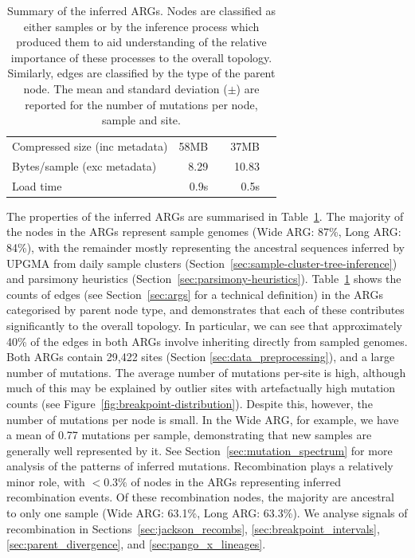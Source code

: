 \documentclass{article}
\begin{document}
\begin{table}
\begin{center}
\begin{tabular}{llrlrl}
    \cmidrule{2-6}
    \multicolumn{2}{l}{Compressed size (inc metadata)} & 58MB & & 37MB&  \\
    \multicolumn{2}{l}{Bytes/sample (exc metadata)}  & 8.29  & & 10.83 \\
    Load time & & 0.9s & & 0.5s & \\
    \bottomrule
\end{tabular}
\end{center}
\caption{\label{tab:args}Summary of the inferred ARGs. Nodes are classified
as either samples or by the inference process which produced them to aid
understanding of the relative importance of these processes to the overall
topology. Similarly, edges are classified by the type of the parent node.
The mean and standard deviation ($\pm$)
are reported for the number of mutations per node, sample and site.
}
\end{table}

The properties of the inferred ARGs are summarised in Table~\ref{tab:args}.
The majority of the nodes in the ARGs represent sample genomes
(Wide ARG: 87\%, Long ARG: 84\%), with the remainder mostly representing
the ancestral sequences inferred by UPGMA
from daily sample clusters (Section~\ref{sec:sample-cluster-tree-inference})
and parsimony heuristics (Section~\ref{sec:parsimony-heuristics}).
Table~\ref{tab:args} shows the counts of edges (see
Section~\ref{sec:args} for a technical definition) in the ARGs
categorised by parent node type, and demonstrates that each
of these contributes significantly to the overall topology.
In particular, we can see that approximately 40\% of the edges
in both ARGs involve inheriting directly from sampled genomes.
Both ARGs contain 29,422 sites (Section \ref{sec:data_preprocessing}),
and a large number of mutations.
The average number of mutations per-site is high, although much
of this may be explained by outlier sites with artefactually high
mutation counts (see Figure~\ref{fig:breakpoint-distribution}).
Despite this, however, the number of mutations per node
is small. In the Wide ARG, for example, we have a mean of 0.77
mutations per sample, demonstrating that new samples are generally
well represented by it. See Section~\ref{sec:mutation_spectrum}
for more analysis of the patterns of inferred mutations.
Recombination plays a relatively minor role, with $<0.3\%$
of nodes in the ARGs representing inferred recombination events.
Of these recombination nodes, the majority are ancestral
to only one sample (Wide ARG: 63.1\%, Long ARG: 63.3\%).
We analyse signals of recombination in Sections~\ref{sec:jackson_recombs},
\ref{sec:breakpoint_intervals}, \ref{sec:parent_divergence},
and \ref{sec:pango_x_lineages}.
\end{document}
